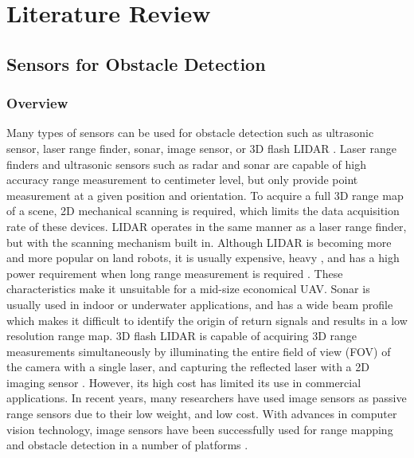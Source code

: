\chapter{Literature Review}\label{ch:Review}

\section{Sensors for Obstacle Detection}\label{sec:sensor}

\subsection{Overview}\label{sec:SensorOverview}
Many types of sensors can be used for obstacle detection such as ultrasonic
sensor, laser range finder, sonar, image sensor, or 3D flash LIDAR
\cite{de_angelis_low-cost_2007} \cite{alonge_novel_2009}
\cite{harb_neural_2008} \cite{saad_robust_2011}
\cite{williams_efficient_2001} \cite{chong_feature-based_1999}
\cite{hanna_obstacle_2008} \cite{lu_distance_2010}
\cite{civera_inverse_2008} \cite{jirawimut_visual_2003}
\cite{amzajerdian_lidar_2011} \cite{nieuwenhuisen_obstacle_2014}. Laser
range finders and ultrasonic sensors such as radar and sonar are
capable of high accuracy range measurement to centimeter level, but
only provide point measurement at a given position and orientation. To
acquire a full 3D range map of a scene, 2D mechanical scanning is
required, which limits the data acquisition rate of these devices.
LIDAR operates in the same manner as a laser range finder, but with the
scanning mechanism built in. Although LIDAR is becoming more and more
popular on land robots, it is usually expensive, heavy
\cite{subharsanan_low_2013}, and has a high power requirement when long
range measurement is required \cite{lemmens_airborne_2007}. These
characteristics make it unsuitable for a mid-size economical UAV. Sonar is
usually used in indoor or underwater applications, and has a wide beam
profile which makes it difficult to identify the origin of return
signals and results in a low resolution range map. 3D flash LIDAR is
capable of acquiring 3D range measurements simultaneously by illuminating
the entire field of view (FOV) of the camera with a single laser, and
capturing the reflected laser with a 2D imaging sensor
\cite{amzajerdian_lidar_2011}. However, its high cost has limited its
use in commercial applications. In recent years, many researchers have used
image sensors as passive range sensors due to their low weight, and low
cost. With advances in computer vision technology, image sensors
have been successfully used for range mapping and obstacle detection
in a number of platforms \cite{einhorn_cant_2010}
\cite{hashimoto_detection_1996} \cite{yamaguchi_moving_2006}
\cite{zhang_obstacle_2012} \cite{maier_self-supervised_2011}
\cite{kubota_global_2007} \cite{xu_method_2009}
\cite{hanna_obstacle_2008} \cite{zhang_real-time_2012}
\cite{van_der_mark_stereo_2007} \cite{broggi_stereo_2011}
\cite{plumet_toward_2014}.

